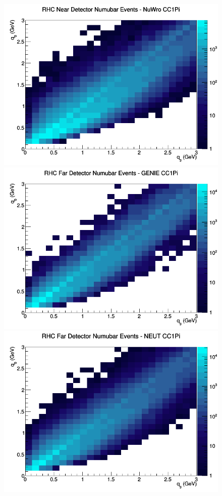 \documentclass[12pt]{article}
\begin{document}
\begin{figure}[h]
\includegraphics[width=\linewidth]{eff_q0_q3/LAr/CC1Pi_RHC_ND_numubar_q3_q0_NuWro.png}
\endminipage
\newline
{}
\includegraphics[width=\linewidth]{eff_q0_q3/LAr/CC1Pi_RHC_FD_numubar_q3_q0_GENIE.png}
\endminipage
{}
\includegraphics[width=\linewidth]{eff_q0_q3/LAr/CC1Pi_RHC_FD_numubar_q3_q0_NEUT.png}

\end{figure}
\end{document}
